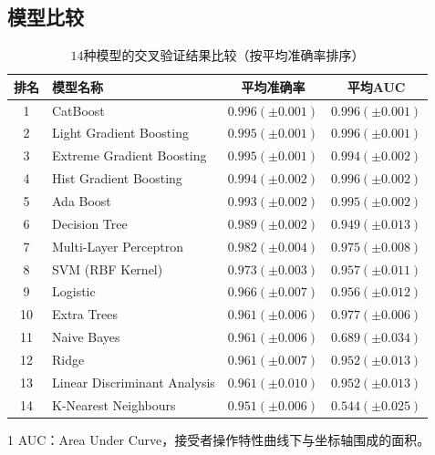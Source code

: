 \subsection{模型比较}

\begin{table}[htb]
    \centering
    \footnotesize
    \begin{threeparttable}
        \begin{tabular}{clcc}
            \toprule
            排名 & 模型名称                         & 平均准确率               & 平均AUC\tnote{1}      \\
            \midrule
            1  & CatBoost                     & $0.996 (\pm 0.001)$ & $0.996 (\pm 0.001)$ \\
            2  & Light Gradient Boosting      & $0.995 (\pm 0.001)$ & $0.996 (\pm 0.001)$ \\
            3  & Extreme Gradient Boosting    & $0.995 (\pm 0.001)$ & $0.994 (\pm 0.002)$ \\
            4  & Hist Gradient Boosting       & $0.994 (\pm 0.002)$ & $0.996 (\pm 0.002)$ \\
            5  & Ada Boost                    & $0.993 (\pm 0.002)$ & $0.995 (\pm 0.002)$ \\
            6  & Decision Tree                & $0.989 (\pm 0.002)$ & $0.949 (\pm 0.013)$ \\
            7  & Multi-Layer Perceptron       & $0.982 (\pm 0.004)$ & $0.975 (\pm 0.008)$ \\
            8  & SVM (RBF Kernel)             & $0.973 (\pm 0.003)$ & $0.957 (\pm 0.011)$ \\
            9  & Logistic                     & $0.966 (\pm 0.007)$ & $0.956 (\pm 0.012)$ \\
            10 & Extra Trees                  & $0.961 (\pm 0.006)$ & $0.977 (\pm 0.006)$ \\
            11 & Naive Bayes                  & $0.961 (\pm 0.006)$ & $0.689 (\pm 0.034)$ \\
            12 & Ridge                        & $0.961 (\pm 0.007)$ & $0.952 (\pm 0.013)$ \\
            13 & Linear Discriminant Analysis & $0.961 (\pm 0.010)$ & $0.952 (\pm 0.013)$ \\
            14 & K-Nearest Neighbours         & $0.951 (\pm 0.006)$ & $0.544 (\pm 0.025)$ \\
            \bottomrule
        \end{tabular}
        \begin{tablenotes}
            \tiny
            \item[1] AUC：Area Under Curve，接受者操作特性曲线下与坐标轴围成的面积。
        \end{tablenotes}
    \end{threeparttable}
    \caption{$14$种模型的交叉验证结果比较（按平均准确率排序）}
    \label{table:model-comparison}
\end{table}

